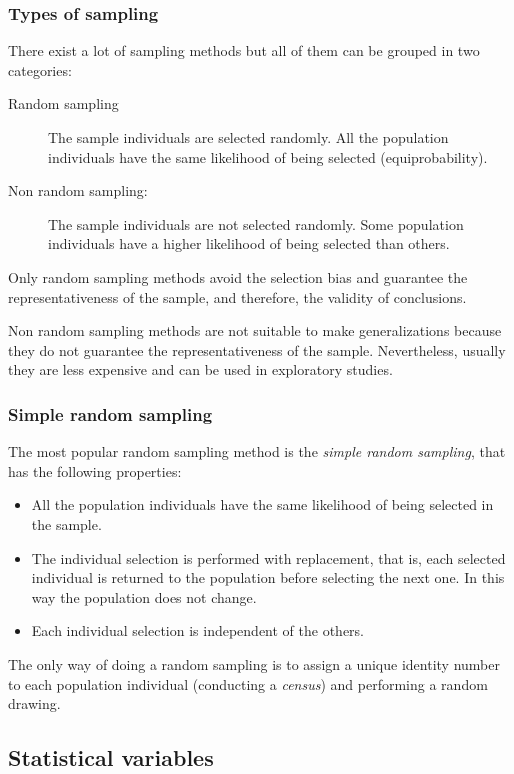 \begin{frame}
\frametitle{Types of sampling}
There exist a lot of sampling methods but all of them can be grouped in two categories:
\begin{description}
\item[Random sampling] The sample individuals are selected randomly. 
All the population individuals have the same likelihood of being selected (equiprobability).  
\item[Non random sampling:] The sample individuals are not selected randomly. 
Some population individuals have a higher likelihood of being selected than others. 
\end{description}

Only random sampling methods avoid the selection bias and guarantee the representativeness of the sample, and therefore,
the validity of conclusions. 

Non random sampling methods are not suitable to make generalizations because they do not guarantee the representativeness of the sample.
Nevertheless, usually they are less expensive and can be used in exploratory studies. 
\end{frame}



\begin{frame}
\frametitle{Simple random sampling}
The most popular random sampling method is the \emph{simple random sampling}, that has the following properties:
\begin{itemize}
\item All the population individuals have the same likelihood of being selected in the sample. 
\item The individual selection is performed with replacement, that is, each selected individual is returned to the population before selecting the next one. 
In this way the population does not change. 
\item Each individual selection is independent of the others. 
\end{itemize}

The only way of doing a random sampling is to assign a unique identity number to each population individual
(conducting a \emph{census}) and performing a random drawing.
\end{frame}


\subsection{Statistical variables}

